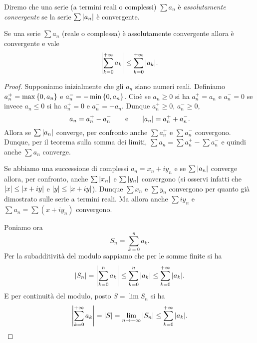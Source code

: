 \begin{definition}
\mymark{***}
Diremo che una serie (a termini reali o complessi) $\sum a_n$
è \emph{assolutamente convergente}%
%
 se la serie $\sum {\left|a_n\right|}$
è convergente.
\end{definition}

\begin{theorem}\label{th:convergenza_assoluta}
\mymark{***}%
Se una serie $\sum a_n$ (reale o complessa)
è assolutamente convergente allora è convergente e vale
\[
  {\left|\sum_{k=0}^{+\infty} a_k\right|} \le \sum_{k=0}^{+\infty} {\left|a_k\right|}.
\]
\end{theorem}
%
\begin{proof}
\mymark{*}
Supponiamo inizialmente che gli $a_n$ siano numeri reali.
Definiamo $a_n^+ = \max{\left\{ 0, a_n \right\}}$ e $a_n^- = -\min {\left\{ 0, a_n \right\}}$.
Cioè se $a_n\ge 0$ si ha $a_n^+ = a_n$ e $a_n^-=0$ se invece $a_n\le 0$
si ha $a_n^+ =0$ e $a_n^- = -a_n$.
Dunque $a_n^+\ge 0$, $a_n^-\ge 0$,
\[
   a_n = a_n^+  - a_n^-
   \qquad\text{e}\qquad
   {\left|a_n\right|} = a_n^+ + a_n^-.
\]
Allora se $\sum {\left|a_n\right|}$ converge,
per confronto anche $\sum a_n^+$ e $\sum a_n^-$ convergono.
Dunque, per il teorema sulla somma dei limiti,
$\sum a_n = \sum a_n^+ - \sum a_n^-$
e quindi anche $\sum a_n$ converge.

Se abbiamo una successione di complessi $a_n = x_n + i y_n$
e se
$\sum {\left|a_n\right|}$ converge allora, per confronto,
anche $\sum {\left|x_n\right|}$ e $\sum{\left|y_n\right|}$ convergono
(si osservi infatti che ${\left|x\right|} \le {\left|x+iy\right|}$ e ${\left|y\right|}\le {\left|x+iy\right|}$).
Dunque $\sum x_n$ e $\sum y_n$ convergono per quanto
già dimostrato sulle serie a termini reali.
Ma allora anche $\sum i y_n$ e $\sum a_n = \sum (x + iy_n)$ convergono.

Poniamo ora
\[
  S_n  = \sum_{k=0}^n a_k.
\]
Per la subadditività
del modulo sappiamo che per le somme finite si ha
\[
 {\left|S_n\right|} ={\left|\sum_{k=0}^n a_k\right|}
 \le \sum_{k=0}^n {\left|a_k\right|} \le \sum_{k=0}^{+\infty} {\left|a_k\right|}.
\]
E per continuità del modulo, posto $S= \lim S_n$ si ha
\[
  {\left|\sum_{k=0}^{+\infty} a_k\right|}
  = {\left|S\right|}
  = \lim_{n\to +\infty} {\left|S_n\right|}
  \le \sum_{k=0}^{+\infty} {\left|a_k\right|}.
\]
\end{proof}

